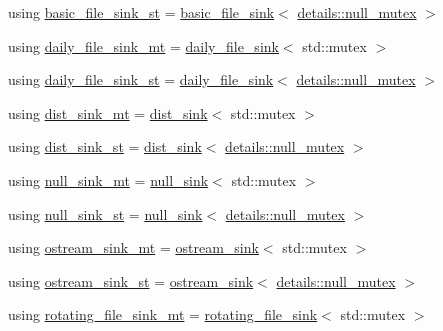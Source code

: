 \begin{DoxyCompactItemize}
\item 
using \hyperlink{namespacespdlog_1_1sinks_ab6d38313481cd7fedfb8aeb68c2c61d1}{basic\+\_\+file\+\_\+sink\+\_\+st} = \hyperlink{classspdlog_1_1sinks_1_1basic__file__sink}{basic\+\_\+file\+\_\+sink}$<$ \hyperlink{structspdlog_1_1details_1_1null__mutex}{details\+::null\+\_\+mutex} $>$
\item 
using \hyperlink{namespacespdlog_1_1sinks_a61124c3792c83b90aad230770f627525}{daily\+\_\+file\+\_\+sink\+\_\+mt} = \hyperlink{classspdlog_1_1sinks_1_1daily__file__sink}{daily\+\_\+file\+\_\+sink}$<$ std\+::mutex $>$
\item 
using \hyperlink{namespacespdlog_1_1sinks_a1f1c8468d4251073ce96194a5db1fb9e}{daily\+\_\+file\+\_\+sink\+\_\+st} = \hyperlink{classspdlog_1_1sinks_1_1daily__file__sink}{daily\+\_\+file\+\_\+sink}$<$ \hyperlink{structspdlog_1_1details_1_1null__mutex}{details\+::null\+\_\+mutex} $>$
\item 
using \hyperlink{namespacespdlog_1_1sinks_a1ec468592fd56492075c61a4917acd12}{dist\+\_\+sink\+\_\+mt} = \hyperlink{classspdlog_1_1sinks_1_1dist__sink}{dist\+\_\+sink}$<$ std\+::mutex $>$
\item 
using \hyperlink{namespacespdlog_1_1sinks_a08b36045f24c178daafc48778df0ce5a}{dist\+\_\+sink\+\_\+st} = \hyperlink{classspdlog_1_1sinks_1_1dist__sink}{dist\+\_\+sink}$<$ \hyperlink{structspdlog_1_1details_1_1null__mutex}{details\+::null\+\_\+mutex} $>$
\item 
using \hyperlink{namespacespdlog_1_1sinks_a0712014c0dae16e0b332d3caba31435a}{null\+\_\+sink\+\_\+mt} = \hyperlink{classspdlog_1_1sinks_1_1null__sink}{null\+\_\+sink}$<$ std\+::mutex $>$
\item 
using \hyperlink{namespacespdlog_1_1sinks_a44a99e8a56b2f902ffd50da4f8628100}{null\+\_\+sink\+\_\+st} = \hyperlink{classspdlog_1_1sinks_1_1null__sink}{null\+\_\+sink}$<$ \hyperlink{structspdlog_1_1details_1_1null__mutex}{details\+::null\+\_\+mutex} $>$
\item 
using \hyperlink{namespacespdlog_1_1sinks_aeef023d4552e1e9be997bec2aa2fb184}{ostream\+\_\+sink\+\_\+mt} = \hyperlink{classspdlog_1_1sinks_1_1ostream__sink}{ostream\+\_\+sink}$<$ std\+::mutex $>$
\item 
using \hyperlink{namespacespdlog_1_1sinks_a7c6131fdceb0975b2700d70994a6b351}{ostream\+\_\+sink\+\_\+st} = \hyperlink{classspdlog_1_1sinks_1_1ostream__sink}{ostream\+\_\+sink}$<$ \hyperlink{structspdlog_1_1details_1_1null__mutex}{details\+::null\+\_\+mutex} $>$
\item 
using \hyperlink{namespacespdlog_1_1sinks_a70b4fab83ca180ef19c4124f4823aeaa}{rotating\+\_\+file\+\_\+sink\+\_\+mt} = \hyperlink{classspdlog_1_1sinks_1_1rotating__file__sink}{rotating\+\_\+file\+\_\+sink}$<$ std\+::mutex $>$

\end{DoxyCompactItemize}
